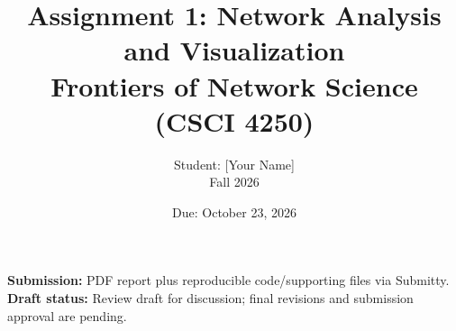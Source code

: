 \documentclass[11pt,letterpaper]{article}
\title{\bfseries Assignment 1: Network Analysis and Visualization\\
  \large Frontiers of Network Science (CSCI 4250)}
\author{Student: [Your Name]\\Fall 2026}
\date{Due: October 23, 2026}
\begin{document}
\maketitle
\noindent\textbf{Submission:} PDF report plus reproducible code/supporting files via Submitty.\\
\noindent\textbf{Draft status:} Review draft for discussion; final revisions and submission approval are pending.
\tableofcontents
\clearpage








\clearpage

\end{document}

